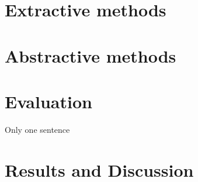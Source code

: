 \documentclass[fleqn,10pt]{SelfArx} %
\begin{document}


\section{Extractive methods}


\section{Abstractive methods}


\section{Evaluation}
Only one sentence

\section{Results and Discussion}




\end{document}
